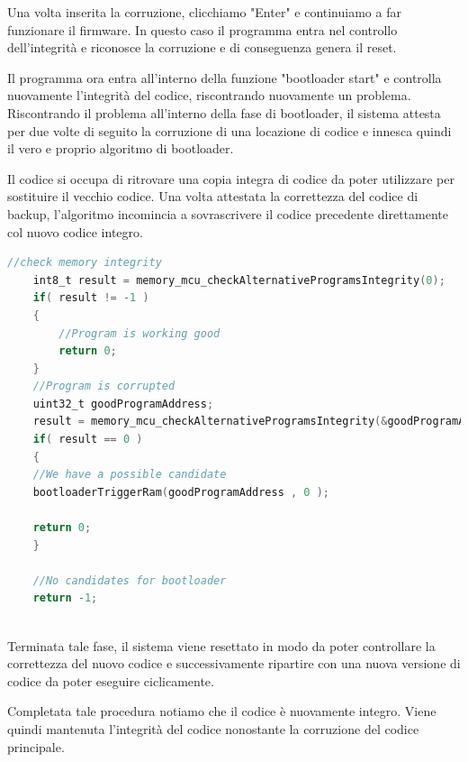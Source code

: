 \documentclass[LaM,binding=0.6cm]{../sapthesis}
\begin{document}
Una volta inserita la corruzione, clicchiamo "Enter" e continuiamo a far funzionare il firmware.
In questo caso il programma entra nel controllo dell'integrità e riconosce la corruzione e di conseguenza genera il reset.

Il programma ora entra all'interno della funzione "bootloader start" e controlla nuovamente l'integrità del codice, riscontrando nuovamente un problema.
Riscontrando il problema all'interno della fase di bootloader, il sistema attesta per due volte di seguito la corruzione di una locazione di codice e innesca quindi il vero e proprio algoritmo di bootloader. 

Il codice si occupa di ritrovare una copia integra di codice da poter utilizzare per sostituire il vecchio codice. Una volta attestata la correttezza del codice di backup, l'algoritmo incomincia a sovrascrivere il codice precedente direttamente col nuovo codice integro.
\newline

\begin{lstlisting}[language=C]
    //check memory integrity
    int8_t result = memory_mcu_checkAlternativeProgramsIntegrity(0);
    if( result != -1 )
    {
        //Program is working good
        return 0;    
    }
    //Program is corrupted
    uint32_t goodProgramAddress;
    result = memory_mcu_checkAlternativeProgramsIntegrity(&goodProgramAddress);
    if( result == 0 )
    {
    //We have a possible candidate
    bootloaderTriggerRam(goodProgramAddress , 0 );
    
    return 0;
    }
    
    //No candidates for bootloader
    return -1;
    
\end{lstlisting}

\newline
Terminata tale fase, il sistema viene resettato in modo da poter controllare la correttezza del nuovo codice e successivamente ripartire con una nuova versione di codice da poter eseguire ciclicamente.

Completata tale procedura notiamo che il codice è nuovamente integro. Viene quindi mantenuta l'integrità del codice
nonostante la corruzione del codice principale.
\end{document}
